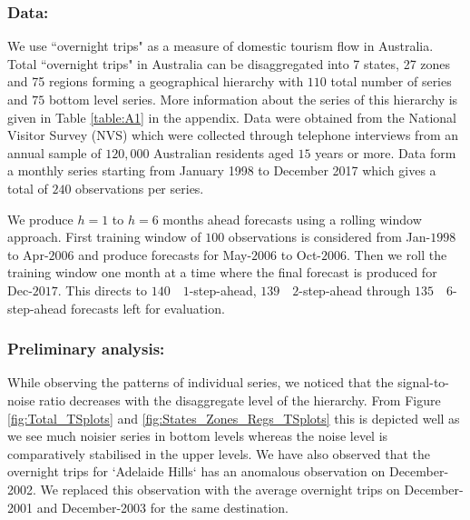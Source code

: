 \documentclass[12pt]{article}
\theoremstyle{definition}
\theoremstyle{property}
\begin{document}
	\subsubsection*{Data:}
	We use ``overnight trips" as a measure of domestic tourism flow in Australia. Total ``overnight trips" in Australia can be disaggregated into 7 states, 27 zones and 75 regions forming a geographical hierarchy with $110$ total number of series and $75$ bottom level series. More information about the series of this hierarchy is given in Table \ref{table:A1} in the appendix. Data were obtained from the National Visitor Survey (NVS) which were collected through telephone interviews from an annual sample of $120,000$ Australian residents aged $15$ years or more. Data form a monthly series starting from January 1998 to December 2017 which gives a total of $240$ observations per series. 
	
	We produce $h=1$ to $h=6$ months ahead forecasts using a rolling window approach. First training window of $100$ observations is considered from Jan-$1998$ to Apr-$2006$ and produce forecasts for May-$2006$ to Oct-$2006$. Then we roll the training window one month at a time where the final forecast is produced for Dec-$2017$. This directs to $140 \quad 1$-step-ahead, $139 \quad 2$-step-ahead through $135 \quad 6$-step-ahead forecasts left for evaluation. 
	
	
	\subsubsection*{Preliminary analysis:}
		
	While observing the patterns of individual series, we noticed that the signal-to-noise ratio decreases with the disaggregate level of the hierarchy. From Figure \ref{fig:Total_TSplots} and \ref{fig:States_Zones_Regs_TSplots} this is depicted well as we see much noisier series in bottom levels whereas the noise level is comparatively stabilised in the upper levels. We have also observed that the overnight trips for `Adelaide Hills` has an anomalous observation on December-2002. We replaced this observation with the average overnight trips on December-2001 and December-2003 for the same destination.
	
\end{document}
